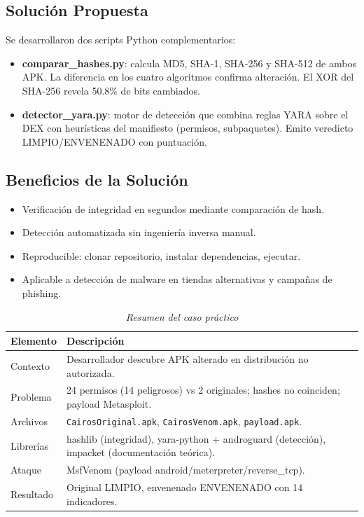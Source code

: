 \documentclass[12pt,a4paper]{article}
\begin{document}
\subsection{Solución Propuesta}

Se desarrollaron dos scripts Python complementarios:

\begin{itemize}
\item \textbf{comparar\_hashes.py}: calcula MD5, SHA-1, SHA-256 y SHA-512 de
  ambos APK. La diferencia en los cuatro algoritmos confirma alteración.
  El XOR del SHA-256 revela 50.8\% de bits cambiados.

\item \textbf{detector\_yara.py}: motor de detección que combina reglas
  YARA sobre el DEX con heurísticas del manifiesto (permisos,
  subpaquetes). Emite veredicto LIMPIO/ENVENENADO con puntuación.
\end{itemize}

\subsection{Beneficios de la Solución}

\begin{itemize}
\item Verificación de integridad en segundos mediante comparación de hash.
\item Detección automatizada sin ingeniería inversa manual.
\item Reproducible: clonar repositorio, instalar dependencias, ejecutar.
\item Aplicable a detección de malware en tiendas alternativas y campañas de phishing.
\end{itemize}

\begin{table}[H]
\centering
\begin{threeparttable}
\caption{\textit{Resumen del caso práctico}}
\begin{tabular}{p{3.5cm}p{9cm}}
\toprule
\textbf{Elemento} & \textbf{Descripción} \\
\midrule
Contexto & Desarrollador descubre APK alterado en distribución no autorizada. \\
Problema & 24 permisos (14 peligrosos) vs 2 originales; hashes no coinciden; payload Metasploit. \\
Archivos & \texttt{CairosOriginal.apk}, \texttt{CairosVenom.apk}, \texttt{payload.apk}. \\
Librerías & hashlib (integridad), yara-python + androguard (detección), impacket (documentación teórica). \\
Ataque & MsfVenom (payload android/meterpreter/reverse\_tcp). \\
Resultado & Original LIMPIO, envenenado ENVENENADO con 14 indicadores. \\
\bottomrule
\end{tabular}
\end{threeparttable}
\end{table}
\end{document}
